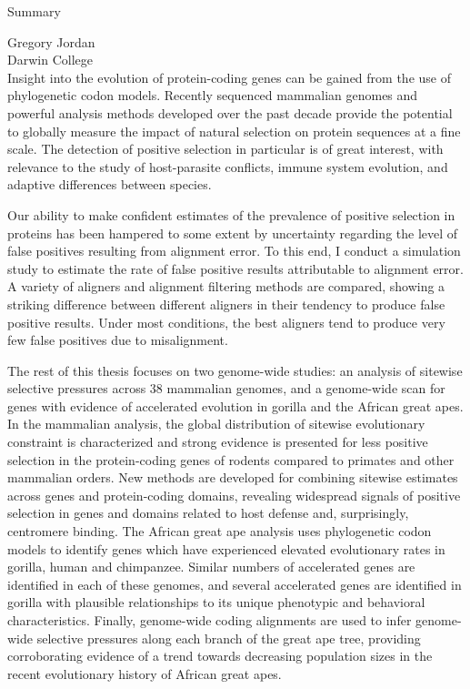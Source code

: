 \begin{center}
\Large \mytitle

\large Summary
\end{center}

\hfill Gregory Jordan \\
\noindent{\today} \hfill Darwin College \\

Insight into the evolution of protein-coding genes can be gained from
the use of phylogenetic codon models. Recently sequenced mammalian
genomes and powerful analysis methods developed over the past decade
provide the potential to globally measure the impact of natural
selection on protein sequences at a fine scale. The detection of
positive selection in particular is of great interest, with relevance
to the study of host-parasite conflicts, immune system evolution, and
adaptive differences between species.

Our ability to make confident estimates of the prevalence of positive
selection in proteins has been hampered to some extent by uncertainty
regarding the level of false positives resulting from alignment
error. To this end, I conduct a simulation study to estimate the rate
of false positive results attributable to alignment error. A variety
of aligners and alignment filtering methods are compared, showing a
striking difference between different aligners in their tendency to
produce false positive results. Under most conditions, the best
aligners tend to produce very few false positives due to misalignment.

The rest of this thesis focuses on two genome-wide studies: an
analysis of sitewise selective pressures across 38 mammalian genomes,
and a genome-wide scan for genes with evidence of accelerated
evolution in gorilla and the African great apes. In the mammalian
analysis, the global distribution of sitewise evolutionary constraint
is characterized and strong evidence is presented for less positive
selection in the protein-coding genes of rodents compared to primates
and other mammalian orders. New methods are developed for combining
sitewise estimates across genes and protein-coding domains, revealing
widespread signals of positive selection in genes and domains related
to host defense and, surprisingly, centromere binding. The African
great ape analysis uses phylogenetic codon models to identify genes
which have experienced elevated evolutionary rates in gorilla, human
and chimpanzee. Similar numbers of accelerated genes are identified in
each of these genomes, and several accelerated genes are identified in
gorilla with plausible relationships to its unique phenotypic and
behavioral characteristics. Finally, genome-wide coding alignments are
used to infer genome-wide selective pressures along each branch of the
great ape tree, providing corroborating evidence of a trend towards
decreasing population sizes in the recent evolutionary history of
African great apes.
